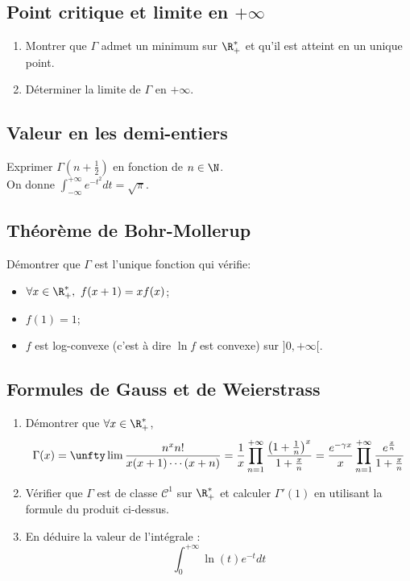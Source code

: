 \documentclass{book}
\begin{document}
	\subsection{Point critique et limite en $+\infty$ }
	\begin{enumerate}[leftmargin=*]
		\item Montrer que $\Gamma$ admet un minimum sur $\R^*_+$ et qu'il est atteint en un unique point.
		\item Déterminer la limite de $\Gamma$ en $+\infty$.
	\end{enumerate}
	
	\subsection{Valeur en les demi-entiers }
	Exprimer $\Gamma\left(n+\displaystyle\frac{1}{2}\right)$ en fonction de $n\in \N$.\\
	On donne $\displaystyle\int_{-\infty}^{+\infty}e^{-t^2}dt=\sqrt\pi$.
	
	\subsection{Théorème de Bohr-Mollerup }
	\label{Bohr-Mollerup}
	Démontrer que $\Gamma$ est l'unique fonction qui vérifie:
	\begin{itemize}
		\item $\forall x \in \R_+^*,\ f(x+1)=xf(x)$;
		\item $f(1)=1$;
		\item $f$ est log-convexe (c'est à dire $\ln f$ est convexe) sur $]0,+\infty[$.
	\end{itemize}
	
	\subsection{Formules de Gauss et de Weierstrass}
	\label{Formules de Gauss et de Weierstrass}
	\begin{enumerate}
		\item Démontrer que $\forall x \in \R^*_+$,
		$$\Gamma(x)=\unfty\lim\frac{n^x n!}{x(x+1)\cdots(x+n)}=\frac{1}{x}\prod_{n=1}^{+\infty}\frac{\left(1+\frac{1}{n}\right)^x}{1+\frac{x}{n}}=\frac{e^{-\gamma x}}{x}\prod_{n=1}^{+\infty}\frac{e^{\frac{x}{n}}}{1+\frac{x}{n}}$$
		\item Vérifier que $\Gamma$ est de classe $\mathcal C^1$ sur $\R^*_+$ et calculer $\Gamma'(1)$ en utilisant la formule du produit ci-dessus.
		\item En déduire la valeur de l'intégrale :
		$$\int_0^{+\infty}\ln(t)e^{-t}dt$$
	\end{enumerate}
	
\end{document}
